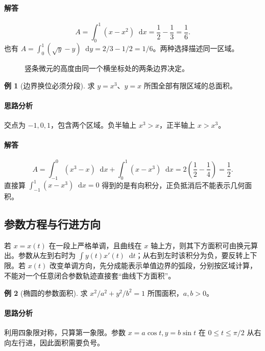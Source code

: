 \documentclass[UTF8,fontset=fandol,12pt,oneside,openany]{ctexrep}
\newcommand{\dd}{\mathop{}\!\mathrm d}
\theoremstyle{definition}
\newtheorem{example}{例}[chapter]
\begin{document}
\paragraph{解答}
\[
 A=\int_0^1(x-x^2)\dd x=\frac12-\frac13=\frac16.
\]
也有 $A=\int_0^1(\sqrt y-y)\dd y=2/3-1/2=1/6$。两种选择描述同一区域。
\begin{figure}[htbp]
\centering
{}
\caption{竖条微元的高度由同一个横坐标处的两条边界决定。}
\end{figure}

\begin{example}[边界换位必须分段]
求 $y=x^3$、$y=x$ 所围全部有限区域的总面积。
\end{example}
\paragraph{思路分析}交点为 $-1,0,1$，包含两个区域。负半轴上 $x^3>x$，正半轴上 $x>x^3$。
\paragraph{解答}
\[
 A=\int_{-1}^0(x^3-x)\dd x+\int_0^1(x-x^3)\dd x
 =2\left(\frac12-\frac14\right)=\frac12.
\]
直接算 $\int_{-1}^1(x-x^3)\dd x=0$ 得到的是有向积分，正负抵消后不能表示几何面积。

\subsection{参数方程与行进方向}
若 $x=x(t)$ 在一段上严格单调，且曲线在 $x$ 轴上方，则其下方面积可由换元算出。参数从左到右时为 $\int y(t)x'(t)\dd t$；从右到左时该积分为负，要反转上下限。若 $x(t)$ 改变单调方向，先分成能表示单值边界的弧段，分别按区域计算，不能对一个任意闭合参数轨迹直接套“曲线下方面积”。

\begin{example}[椭圆的参数面积]
求 $x^2/a^2+y^2/b^2=1$ 所围面积，$a,b>0$。
\end{example}
\paragraph{思路分析}利用四象限对称，只算第一象限。参数 $x=a\cos t,y=b\sin t$ 在 $0\le t\le\pi/2$ 从右向左行进，因此面积需要负号。
\end{document}
